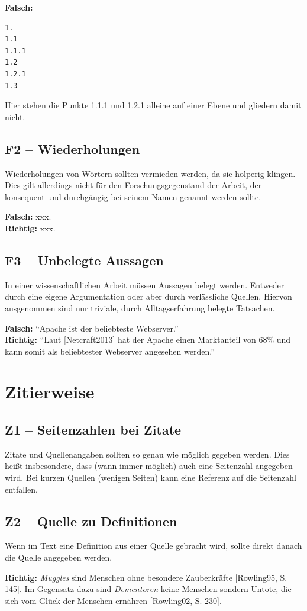\documentclass[a4paper,11pt,headings=normal]{scrartcl}
\begin{document}
\textbf{Falsch:}
\begin{verbatim}
1.
1.1
1.1.1
1.2
1.2.1
1.3
\end{verbatim}
Hier stehen die Punkte 1.1.1 und 1.2.1 alleine auf einer Ebene und gliedern damit nicht.


\subsection*{F2 -- Wiederholungen}

Wiederholungen von Wörtern sollten vermieden werden, da sie holperig klingen. Dies gilt allerdings nicht für den Forschungsgegenstand der Arbeit, der konsequent und durchgängig bei seinem Namen genannt werden sollte.

\textbf{Falsch:} xxx. \\
\textbf{Richtig:} xxx.


\subsection*{F3 -- Unbelegte Aussagen}

In einer wissenschaftlichen Arbeit müssen Aussagen belegt werden. Entweder durch eine eigene Argumentation oder aber durch verlässliche Quellen. Hiervon ausgenommen sind nur triviale, durch Alltagserfahrung belegte Tatsachen.

\textbf{Falsch:} "`Apache ist der beliebteste Webserver."' \\
\textbf{Richtig:} "`Laut [Netcraft2013] hat der Apache einen Marktanteil von 68\% und kann somit als beliebtester Webserver angesehen werden."'

\section{Zitierweise}

\subsection*{Z1 -- Seitenzahlen bei Zitate}

Zitate und Quellenangaben sollten so genau wie möglich gegeben werden. Dies heißt insbesondere, dass (wann immer möglich) auch eine Seitenzahl angegeben wird. Bei kurzen Quellen (wenigen Seiten) kann eine Referenz auf die Seitenzahl entfallen.


\subsection*{Z2 -- Quelle zu Definitionen}

Wenn im Text eine Definition aus einer Quelle gebracht wird, sollte direkt danach die Quelle angegeben werden.

\textbf{Richtig:} \textit{Muggles} sind Menschen ohne besondere Zauberkräfte [Rowling95, S. 145]. Im Gegensatz dazu sind \textit{Dementoren} keine Menschen sondern Untote, die sich vom Glück der Menschen ernähren [Rowling02, S. 230].
\end{document}
